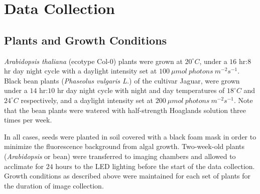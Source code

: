 \section{Data Collection}\label{sec:2}

\subsection{Plants and Growth Conditions}

{\it Arabidopsis thaliana} (ecotype Col-0) plants were grown at $20^{\circ}C$, under a $16$ hr:$8$ hr day night cycle with a daylight intensity set at $100~\mu mol~photons~m^{-2} s^{-1}$.
%
Black bean plants ({\it Phaseolus vulgaris L.}) of the cultivar Jaguar, were grown under a $14$ hr:$10$ hr day night cycle with night and day temperatures of $18^{\circ}C$ and $24^{\circ}C$ respectively, and a daylight intensity set at $200~\mu mol~photons~m^{-2} s^{-1}$.
%
Note that the bean plants were watered with half-strength Hoaglands solution three times per week. 

In all cases, seeds were planted in soil covered with a black foam mask in order to minimize the fluorescence background from algal growth.
%
Two-week-old plants ({\it Arabidopsis} or bean) were transferred to imaging chambers and allowed to acclimate for $24$ hours to the LED lighting before the start of the data collection. 
Growth conditions as described above were maintained for each set of plants for the duration of image collection.
